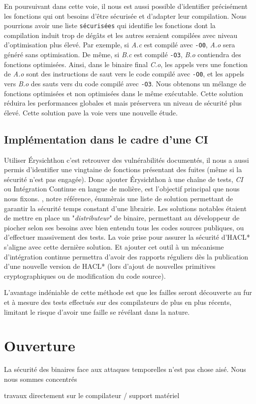 En poursuivant dans cette voie, il nous est aussi possible d'identifier précisément les fonctions qui ont besoins d'être sécurisée et d'adapter leur compilation. Nous pourrions avoir une liste \texttt{sécurisées} qui identifie les fonctions dont la compilation induit trop de dégâts et les autres seraient compilées avec niveau d'optimisation plus élevé. Par exemple, si \textit{A.c} est compilé avec \texttt{-O0}, \textit{A.o} sera généré sans optimisation. De même, si \textit{B.c} est compilé \texttt{-O3}, \textit{B.o} contiendra des fonctions optimisées. Ainsi, dans le binaire final \textit{C.o}, les appels vers une fonction de \textit{A.o} sont des instructions de saut vers le code compilé avec \texttt{-O0}, et les appels vers \textit{B.o} des sauts vers du code compilé avec \texttt{-O3}. Nous obtenons un mélange de fonctions optimisées et non optimisées dans le même exécutable. Cette solution réduira les performances globales et mais préservera un niveau de sécurité plus élevé. Cette solution pave la voie vers une nouvelle étude.\medbreak

\subsection*{Implémentation dans le cadre d'une CI}

Utiliser Érysichthon c'est retrouver des vulnérabilités documentés, il nous a aussi permis d'identifier une vingtaine de fonctions présentant des fuites (même si la sécurité n'est pas engagée). Donc ajouter Érysichthon à une chaîne de tests, \textit{CI} ou Intégration Continue en langue de molière, est l'objectif principal que nous nous fixons. \citeauthor{schneider2024breakingbadcompilersbreak}, notre référence, énumèrais une liste de solution permettant de garantir la sécurité temps constant d'une librairie. Les solutions notables étaient de mettre en place un "\textit{distributeur}" de binaire, permettant au développeur de piocher selon ses besoins avec bien entendu tous les codes sources publiques, ou d'effectuer massivement des tests. La voie prise pour assurer la sécurité d'HACL* s'aligne avec cette dernière solution. Et ajouter cet outil à un mécanisme d'intégration continue permettra d'avoir des rapports réguliers dès la publication d'une nouvelle version de HACL* (lors d'ajout de nouvelles primitives cryptographiques ou de modification du code source).\smallbreak

L'avantage indéniable de cette méthode est que les failles seront découverte au fur et à mesure des tests effectués sur des compilateurs de plus en plus récents, limitant le risque d'avoir une faille se révélant dans la nature.


\section*{Ouverture}

La sécurité des binaires face aux attaques temporelles n'est pas chose aisé. Nous nous sommes concentrés



travaux directement sur le compilateur / support matériel